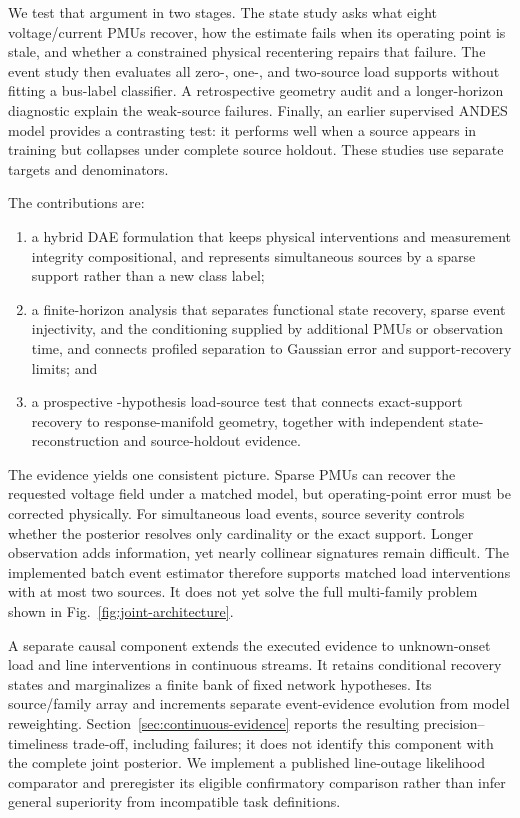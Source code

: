 We test that argument in two stages. The state study asks what eight voltage/current PMUs recover, how the estimate fails when its operating point is stale, and whether a constrained physical recentering repairs that failure. The event study then evaluates all zero-, one-, and two-source load supports without fitting a bus-label classifier. A retrospective geometry audit and a longer-horizon diagnostic explain the weak-source failures. Finally, an earlier supervised ANDES model provides a contrasting test: it performs well when a source appears in training but collapses under complete source holdout. These studies use separate targets and denominators.

The contributions are:
\begin{enumerate}
  \item a hybrid DAE formulation that keeps physical interventions and measurement integrity compositional, and represents simultaneous sources by a sparse support rather than a new class label;
  \item a finite-horizon analysis that separates functional state recovery, sparse event injectivity, and the conditioning supplied by additional PMUs or observation time, and connects profiled separation to Gaussian error and support-recovery limits; and
  \item a prospective \GlobalHypothesisCount{}-hypothesis load-source test that connects exact-support recovery to response-manifold geometry, together with independent state-reconstruction and source-holdout evidence.
\end{enumerate}

The evidence yields one consistent picture. Sparse PMUs can recover the requested voltage field under a matched model, but operating-point error must be corrected physically. For simultaneous load events, source severity controls whether the posterior resolves only cardinality or the exact support. Longer observation adds information, yet nearly collinear signatures remain difficult. The implemented batch event estimator therefore supports matched load interventions with at most two sources. It does not yet solve the full multi-family problem shown in Fig.~\ref{fig:joint-architecture}.

A separate causal component extends the executed evidence to unknown-onset load and line interventions in continuous streams. It retains conditional recovery states and marginalizes a finite bank of fixed network hypotheses. Its source/family array and increments separate event-evidence evolution from model reweighting. Section~\ref{sec:continuous-evidence} reports the resulting precision--timeliness trade-off, including failures; it does not identify this component with the complete joint posterior. We implement a published line-outage likelihood comparator and preregister its eligible confirmatory comparison rather than infer general superiority from incompatible task definitions.

